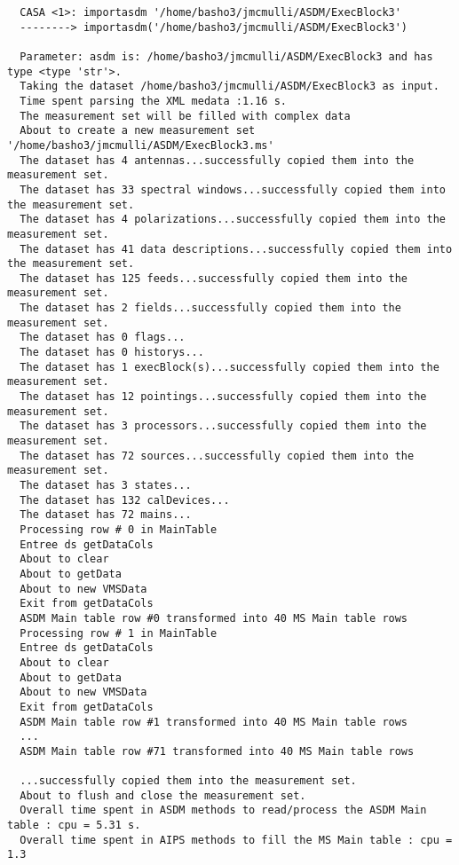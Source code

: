 \small
\begin{verbatim}
  CASA <1>: importasdm '/home/basho3/jmcmulli/ASDM/ExecBlock3'
  --------> importasdm('/home/basho3/jmcmulli/ASDM/ExecBlock3')

  Parameter: asdm is: /home/basho3/jmcmulli/ASDM/ExecBlock3 and has type <type 'str'>.
  Taking the dataset /home/basho3/jmcmulli/ASDM/ExecBlock3 as input.
  Time spent parsing the XML medata :1.16 s.
  The measurement set will be filled with complex data
  About to create a new measurement set '/home/basho3/jmcmulli/ASDM/ExecBlock3.ms'
  The dataset has 4 antennas...successfully copied them into the measurement set.
  The dataset has 33 spectral windows...successfully copied them into the measurement set.
  The dataset has 4 polarizations...successfully copied them into the measurement set.
  The dataset has 41 data descriptions...successfully copied them into the measurement set.
  The dataset has 125 feeds...successfully copied them into the measurement set.
  The dataset has 2 fields...successfully copied them into the measurement set.
  The dataset has 0 flags...
  The dataset has 0 historys...
  The dataset has 1 execBlock(s)...successfully copied them into the measurement set.
  The dataset has 12 pointings...successfully copied them into the measurement set.
  The dataset has 3 processors...successfully copied them into the measurement set.
  The dataset has 72 sources...successfully copied them into the measurement set.
  The dataset has 3 states...
  The dataset has 132 calDevices...
  The dataset has 72 mains...
  Processing row # 0 in MainTable
  Entree ds getDataCols
  About to clear
  About to getData
  About to new VMSData
  Exit from getDataCols
  ASDM Main table row #0 transformed into 40 MS Main table rows
  Processing row # 1 in MainTable
  Entree ds getDataCols
  About to clear
  About to getData
  About to new VMSData
  Exit from getDataCols
  ASDM Main table row #1 transformed into 40 MS Main table rows
  ...
  ASDM Main table row #71 transformed into 40 MS Main table rows

  ...successfully copied them into the measurement set.
  About to flush and close the measurement set.
  Overall time spent in ASDM methods to read/process the ASDM Main table : cpu = 5.31 s.
  Overall time spent in AIPS methods to fill the MS Main table : cpu = 1.3
\end{verbatim}
\normalsize


